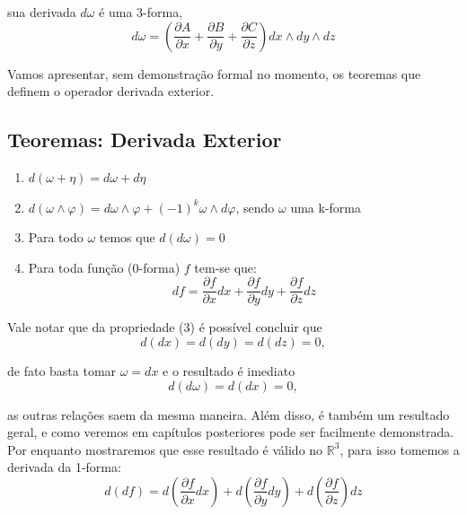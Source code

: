 sua derivada $d\omega$ é uma 3-forma,
%
\begin{equation}
d\omega = \left(\frac{\partial A}{\partial x} 
+ \frac{\partial B}{\partial y} 
+ \frac{\partial C}{\partial z}\right) dx 
\wedge dy \wedge dz
\end{equation}

Vamos apresentar, sem demonstração formal no momento, 
os teoremas que definem o operador derivada exterior.



\subsection{Teoremas: Derivada Exterior} 

\begin{enumerate}
  \item $ d(\omega + \eta) = d\omega + d\eta$
  \item $ d(\omega \wedge \varphi) = d\omega \wedge \varphi 
  + (-1)^{k}\omega \wedge d\varphi$, sendo $\omega$ uma k-forma
  \item Para todo $\omega$ temos que $d(d\omega) = 0$
  \item Para toda função (0-forma) $f$ tem-se que:
  \begin{equation}
  df = \frac{\partial f}{\partial x}dx + \frac{\partial f}{\partial y}dy 
  + \frac{\partial f}{\partial z}dz
  \end{equation}
\end{enumerate}

Vale notar que da propriedade (3) é possível concluir que 
%
\begin{equation}
d(dx) = d(dy) = d(dz) = 0,
\end{equation}

de fato basta tomar $\omega = dx$ e o resultado é imediato
%
\begin{equation}
d(d\omega) = d(dx) = 0,
\end{equation}

as outras relações saem da mesma maneira. Além disso, é também um resultado geral, e como veremos em capítulos posteriores pode ser facilmente demonstrada. Por enquanto mostraremos que esse resultado é válido no $\mathbb{R}^3$, para isso tomemos a derivada da 1-forma:
%
\begin{equation}
d(df) = d\left(\frac{\partial f}{\partial x}dx\right) 
+ d\left(\frac{\partial f}{\partial y}dy\right) 
+ d\left(\frac{\partial f}{\partial z}\right)dz
\end{equation}

